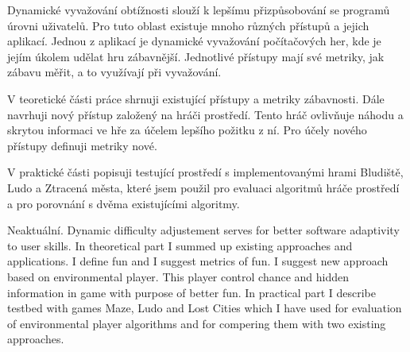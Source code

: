 \startAbstractCz
  Dynamické vyvažování obtížnosti slouží k lepšímu přizpůsobování se programů úrovni uživatelů. Pro tuto oblast existuje mnoho různých přístupů a jejich aplikací. Jednou z aplikací je dynamické vyvažování počítačových her, kde je jejím úkolem udělat hru zábavnější. Jednotlivé přístupy mají své metriky, jak zábavu měřit, a to využívají při vyvažování.
	
V teoretické části práce shrnuji existující přístupy a metriky zábavnosti. Dále navrhuji nový přístup založený na hráči prostředí. Tento hráč ovlivňuje náhodu a skrytou informaci ve hře za účelem lepšího požitku z ní. Pro účely nového přístupy definuji metriky nové.

V praktické části popisuji testující prostředí s implementovanými hrami Bludiště, Ludo a Ztracená města, které jsem použil pro evaluaci algoritmů hráče prostředí a pro porovnání s dvěma existujícími algoritmy.
\stopAbstractCz

\startAbstractEn
Neaktuální.
  Dynamic difficulty adjustement serves for better software adaptivity to user skills. In theoretical part I summed up existing approaches and applications. I define fun and I suggest metrics of fun. I suggest new approach based on environmental player. This player control chance and hidden information in game with purpose of better fun. In practical part I describe testbed with games Maze, Ludo and Lost Cities which I have used for evaluation of environmental player algorithms and for compering them with two existing approaches.
\stopAbstractEn

\endinput
